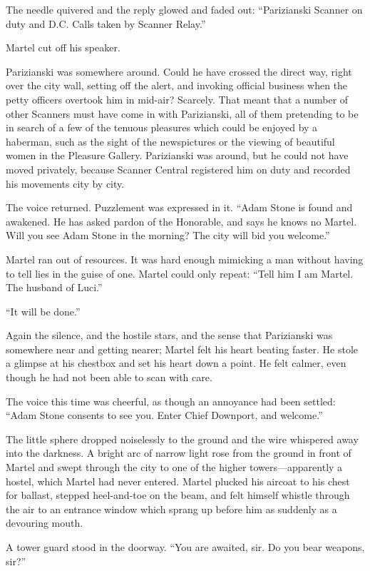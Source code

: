 The needle quivered and the reply glowed and faded out: ``Parizianski Scanner on duty and D.C. Calls taken by Scanner Relay.''

Martel cut off his speaker.

Parizianski was somewhere around. Could he have crossed the direct way, right over the city wall, setting off the alert, and invoking official business when the petty officers overtook him in mid-air? Scarcely. That meant that a number of other Scanners must have come in with Parizianski, all of them pretending to be in search of a few of the tenuous pleasures which could be enjoyed by a haberman, such as the sight of the newspictures or the viewing of beautiful women in the Pleasure Gallery. Parizianski was around, but he could not have moved privately, because Scanner Central registered him on duty and recorded his movements city by city.

The voice returned. Puzzlement was expressed in it. ``Adam Stone is found and awakened. He has asked pardon of the Honorable, and says he knows no Martel. Will you see Adam Stone in the morning? The city will bid you welcome.''

Martel ran out of resources. It was hard enough mimicking a man without having to tell lies in the guise of one. Martel could only repeat: ``Tell him I am Martel. The husband of Luci.''

``It will be done.''

Again the silence, and the hostile stars, and the sense that Parizianski was somewhere near and getting nearer; Martel felt his heart beating faster. He stole a glimpse at his chestbox and set his heart down a point. He felt calmer, even though he had not been able to scan with care.

The voice this time was cheerful, as though an annoyance had been settled: ``Adam Stone consents to see you. Enter Chief Downport, and welcome.''

The little sphere dropped noiselessly to the ground and the wire whispered away into the darkness. A bright arc of narrow light rose from the ground in front of Martel and swept through the city to one of the higher towers---apparently a hostel, which Martel had never entered. Martel plucked his aircoat to his chest for ballast, stepped heel-and-toe on the beam, and felt himself whistle through the air to an entrance window which sprang up before him as suddenly as a devouring mouth.

A tower guard stood in the doorway. ``You are awaited, sir. Do you bear weapons, sir?''

